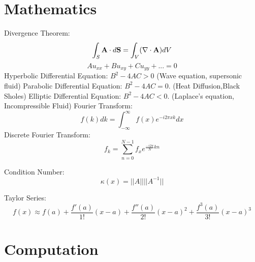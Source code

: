 \documentclass{article}
\begin{document}
%
%
\newpage
\section{Mathematics}
Divergence Theorem:
\begin{equation}
  \int_{S}{\bf A}\cdot d{\bf S}=\int_{V}(\nabla \cdot {\bf A})dV
\end{equation}
\newline
\newline
\begin{equation}
  Au_{xx} + Bu_{xy} + Cu_{yy} + ... = 0
\end{equation}
\newline
\newline
Hyperbolic Differential Equation: $B^2-4AC > 0$ (Wave equation, supersonic fluid)
\newline
\newline
Parabolic Differential Equation: $B^2-4AC = 0$. (Heat Diffusion,Black Sholes)
\newline
\newline
Elliptic Differential Equation: $B^2-4AC < 0$. (Laplace's equation, Incompressible Fluid)
\newline
\newline
Fourier Transform:
\begin{equation}
  f(k)dk = \int^{\infty}_{-\infty} f(x)e^{-i2\pi x k}dx
\end{equation}
Discrete Fourier Transform:
\begin{equation}
  f_k = \sum^{N-1}_{n=0} f_x e^{\frac{-i2\pi}{N} k n}
\end{equation}

Condition Number: 
\begin{equation}
  \kappa(x) = ||A|| ||A^{-1}||
\end{equation}

Taylor Series:
\begin{equation}
  f(x) \approx f(a) + \frac{f'(a)}{1!}(x-a) + \frac{f''(a)}{2!}(x-a)^2 + \frac{f^3(a)}{3!}(x-a)^3
\end{equation}



%
%
\newpage
\section{Computation}
\end{document}
